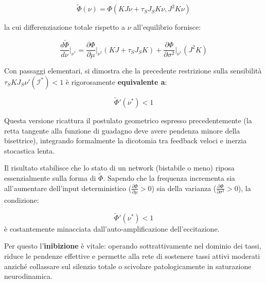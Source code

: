 \begin{equation}
\tilde{\Phi}(\nu) = \Phi(K J \nu + \tau_S J_S K \nu, J^2 K \nu)
\end{equation}

la cui differenziazione totale rispetto a $\nu$ all'equilibrio fornisce:

\begin{equation}
\frac{d\tilde{\Phi}}{d\nu}\bigg|_{\nu^*} = \frac{\partial \Phi}{\partial \mu}\bigg|_{\nu^*} (K J + \tau_S J_S K) + \frac{\partial \Phi}{\partial \sigma^2}\bigg|_{\nu^*} (J^2 K)
\end{equation}

Con passaggi elementari, si dimostra che la precedente restrizione sulla sensibilità $\tau_S K J_S \nu'(\mathcal{I}^*) < 1$ è rigorosamente \textbf{equivalente a}:

\begin{equation}
\tilde{\Phi}'(\nu^*) < 1
\end{equation}

Questa versione ricattura il postulato geometrico espresso precedentemente (la retta tangente alla funzione di guadagno deve avere pendenza minore della bisettrice), integrando formalmente la dicotomia tra feedback veloci e inerzia stocastica lenta.



Il risultato stabilisce che lo stato di un network (bistabile o meno) riposa essenzialmente sulla forma di $\tilde{\Phi}$. Sapendo che la frequenza incrementa sia all'aumentare dell'input deterministico ($\frac{\partial\Phi}{\partial\mu} > 0$) sia della varianza ($\frac{\partial\Phi}{\partial\sigma^2} > 0$), la condizione:

\begin{equation}
\tilde{\Phi}'(\nu^*) < 1
\end{equation}
è costantemente minacciata dall'auto-amplificazione dell'eccitazione. 

Per questo l'\textbf{inibizione} è vitale: operando sottrattivamente nel dominio dei tassi, riduce le pendenze effettive e permette alla rete di sostenere tassi attivi moderati anziché collassare sul silenzio totale o scivolare patologicamente in saturazione neurodinamica.

